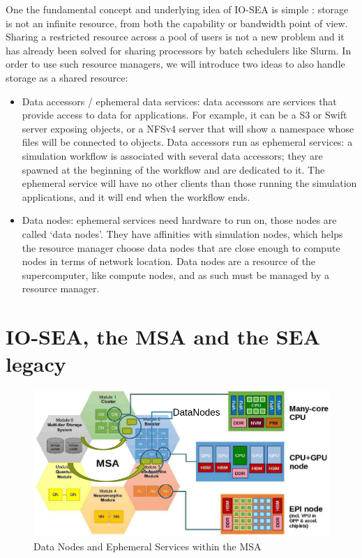 One the fundamental concept and underlying idea of IO-SEA is simple : storage is not an infinite resource, 
from both the capability or bandwidth point of view.   Sharing a restricted resource across a pool of users is
not a new problem and it has already been solved for sharing processors by batch schedulers like Slurm. In order
to use such resource managers, we will introduce two ideas to also handle storage as a shared resource:
\begin{itemize}
    \item Data accessors / ephemeral data services: data accessors are services that provide access to data for applications. For example, it can be a S3 or Swift server exposing objects, or a NFSv4 server that will show a namespace whose files will be connected to objects. Data accessors run as ephemeral services: a simulation workflow is associated with several data accessors; they are spawned at the beginning of the workflow and are dedicated to it. The ephemeral service will have no other clients than those running the simulation applications, and it will end when the workflow ends.
    
    \item Data nodes: ephemeral services need hardware to run on, those nodes are called ‘data nodes’. They have affinities with simulation nodes, which helps the resource manager choose data nodes that are close enough to compute nodes in terms of network location. Data nodes are a resource of the supercomputer, like compute nodes, and as such must be managed by a resource manager.
\end{itemize}

\section{IO-SEA, the MSA and the SEA legacy}

\begin{figure}[ht]
    \centering
    \includegraphics[width=\textwidth]{FIGS/MSA.png}
    \caption[The Modular Supercomputer Architecture]{ Data Nodes and Ephemeral Services within the MSA}
    \label{fig:msa}
\end{figure}

